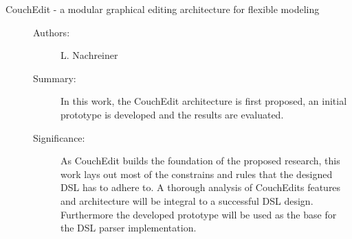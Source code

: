 \documentclass[10pt,a4paper,oneside]{scrartcl}
\begin{document}


\begin{description}
  \item[CouchEdit - a modular graphical editing architecture for flexible modeling] \cite{nachreiner_couchedit_2020}

        \begin{description}
          \item[Authors:] L. Nachreiner
          \item[Summary:] In this work, the CouchEdit architecture is first proposed, an initial prototype is developed and the results are evaluated.
          \item[Significance:] As CouchEdit builds the foundation of the proposed research, this work lays out most of the constrains and rules that the designed DSL has to adhere to. A thorough analysis of CouchEdits features and architecture will be integral to a successful DSL design. Furthermore the developed prototype will be used as the base for the DSL parser implementation.

        \end{description}


\end{description}
\end{document}
